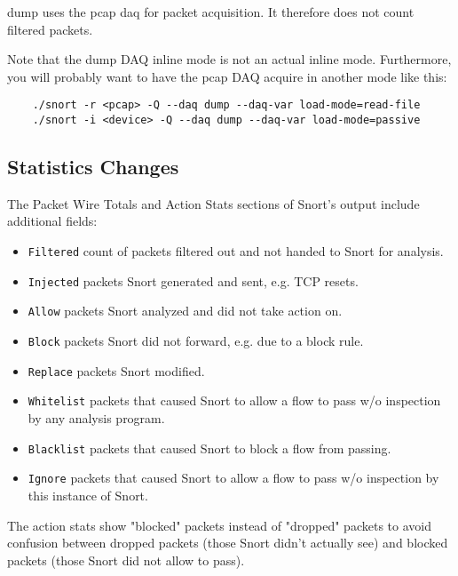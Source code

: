 \documentclass[english]{report}
\begin{document}
dump uses the pcap daq for packet acquisition.  It therefore does not count
filtered packets.

Note that the dump DAQ inline mode is not an actual inline mode.  Furthermore,
you will probably want to have the pcap DAQ acquire in another mode like this:

\begin{verbatim}
    ./snort -r <pcap> -Q --daq dump --daq-var load-mode=read-file
    ./snort -i <device> -Q --daq dump --daq-var load-mode=passive
\end{verbatim}

\subsection{Statistics Changes}

The Packet Wire Totals and Action Stats sections of Snort's output include
additional fields:

\begin{itemize}
\item \texttt{Filtered}
count of packets filtered out and not handed to Snort for analysis.

\item \texttt{Injected}
packets Snort generated and sent, e.g. TCP resets.

\item \texttt{Allow}
packets Snort analyzed and did not take action on.

\item \texttt{Block}
packets Snort did not forward, e.g. due to a block rule.

\item \texttt{Replace}
packets Snort modified.

\item \texttt{Whitelist}
packets that caused Snort to allow a flow to pass w/o inspection by any
analysis program.

\item \texttt{Blacklist}
packets that caused Snort to block a flow from passing.

\item \texttt{Ignore}
packets that caused Snort to allow a flow to pass w/o inspection by this
instance of Snort.
\end{itemize}

The action stats show "blocked" packets instead of "dropped" packets to avoid
confusion between dropped packets (those Snort didn't actually see) and blocked
packets (those Snort did not allow to pass).
\end{document}
